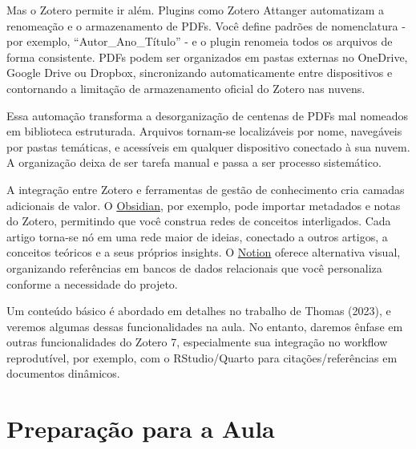 \documentclass[
  a4paper,
]{book}
\begin{document}
Mas o Zotero permite ir além. Plugins como Zotero Attanger automatizam a
renomeação e o armazenamento de PDFs. Você define padrões de
nomenclatura - por exemplo, ``Autor\_Ano\_Título'' - e o plugin renomeia
todos os arquivos de forma consistente. PDFs podem ser organizados em
pastas externas no OneDrive, Google Drive ou Dropbox, sincronizando
automaticamente entre dispositivos e contornando a limitação de
armazenamento oficial do Zotero nas nuvens.

Essa automação transforma a desorganização de centenas de PDFs mal
nomeados em biblioteca estruturada. Arquivos tornam-se localizáveis por
nome, navegáveis por pastas temáticas, e acessíveis em qualquer
dispositivo conectado à sua nuvem. A organização deixa de ser tarefa
manual e passa a ser processo sistemático.

A integração entre Zotero e ferramentas de gestão de conhecimento cria
camadas adicionais de valor. O \href{https://obsidian.md/}{Obsidian},
por exemplo, pode importar metadados e notas do Zotero, permitindo que
você construa redes de conceitos interligados. Cada artigo torna-se nó
em uma rede maior de ideias, conectado a outros artigos, a conceitos
teóricos e a seus próprios insights. O
\href{https://www.notion.com/pt}{Notion} oferece alternativa visual,
organizando referências em bancos de dados relacionais que você
personaliza conforme a necessidade do projeto.

Um conteúdo básico é abordado em detalhes no trabalho de Thomas (2023),
e veremos algumas dessas funcionalidades na aula. No entanto, daremos
ênfase em outras funcionalidades do Zotero 7, especialmente sua
integração no workflow reprodutível, por exemplo, com o RStudio/Quarto
para citações/referências em documentos dinâmicos.

\section{Preparação para a Aula}\label{preparauxe7uxe3o-para-a-aula-2}
\end{document}

